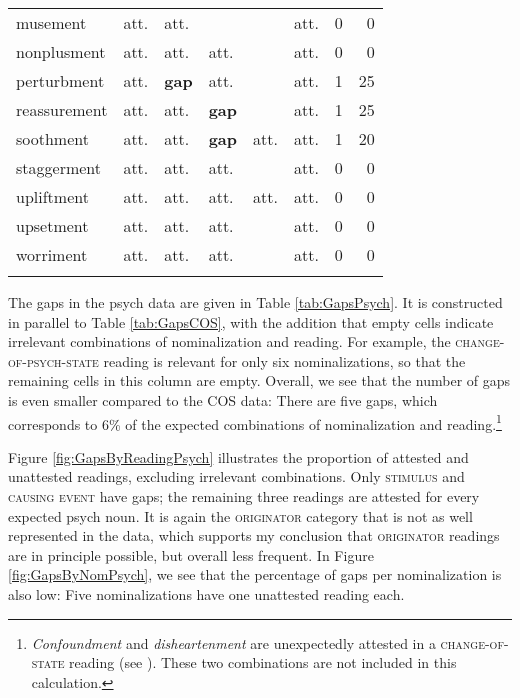 \begin{table}
\begin{tabular}{llllllrr}
musement       & att.  & att. &         &         & att. & 0 & 0  \\
 nonplusment    & att.  & att. & att.        &         & att. & 0 & 0  \\
perturbment    & att.  & \textbf{gap}  & att.        &         & att. &  1 & 25 \\
 reassurement   & att.  & att. & \textbf{gap}         &         & att. &  1 & 25 \\
soothment      & att.  & att. & \textbf{gap}         & att.    & att. &  1 & 20 \\
 staggerment    & att.  & att. & att.        &         & att. & 0 & 0  \\
upliftment     & att.  & att. & att.        & att.    & att. & 0 & 0  \\
 upsetment      & att.  & att. & att.        &         & att. & 0 & 0  \\
worriment      & att.  & att. & att.        &         & att. & 0 & 0  \\
\lspbottomrule
\end{tabular}
\end{table}


The gaps in the psych data are given in Table \ref{tab:GapsPsych}. It is constructed in parallel to Table \ref{tab:GapsCOS}, with the addition that empty cells indicate irrelevant combinations of nominalization and reading. For example, the \textsc{change-of-psych-state} reading is relevant for only six nominalizations, so that the remaining cells in this column are empty.\largerpage
Overall, we see that the number of gaps is even smaller compared to the COS data: There are five gaps, which corresponds to 6\% of the expected combinations of nominalization and reading.{\footnote{\textit{Confoundment} and \textit{disheartenment} are unexpectedly attested in a \textsc{change-of-state} reading (see ). These two combinations are not included in this calculation.}}

Figure \ref{fig:GapsByReadingPsych} illustrates the proportion of attested and unattested readings, excluding irrelevant combinations. Only \textsc{stimulus} and \textsc{causing event} have gaps; the remaining three readings are attested for every expected psych noun. 
It is again the \textsc{originator} category that is not as well represented in the data, which supports my conclusion that \textsc{originator} readings are in principle possible, but overall less frequent.
In Figure \ref{fig:GapsByNomPsych}, we see that the percentage of gaps per nominalization is also low: Five nominalizations have one unattested reading each.

